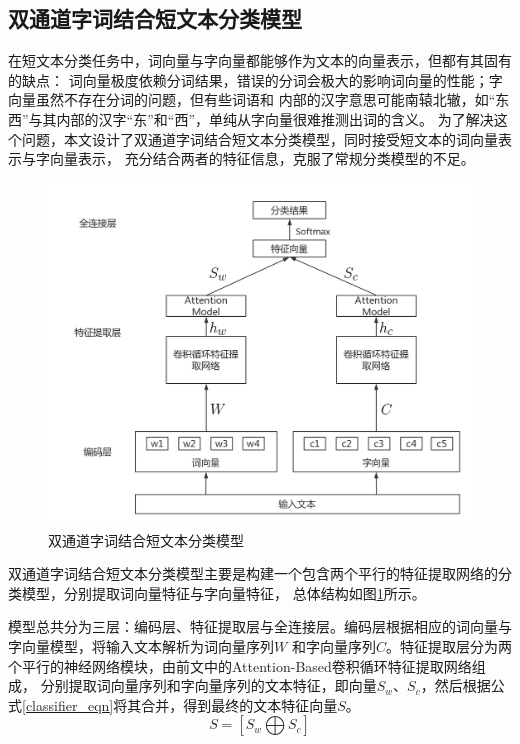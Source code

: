 \subsection{双通道字词结合短文本分类模型}
在短文本分类任务中，词向量与字向量都能够作为文本的向量表示，但都有其固有的缺点：
词向量极度依赖分词结果，错误的分词会极大的影响词向量的性能；字向量虽然不存在分词的问题，但有些词语和
内部的汉字意思可能南辕北辙，如“东西”与其内部的汉字“东”和“西”，单纯从字向量很难推测出词的含义。
为了解决这个问题，本文设计了双通道字词结合短文本分类模型，同时接受短文本的词向量表示与字向量表示，
充分结合两者的特征信息，克服了常规分类模型的不足。

\begin{figure}[h]
    \includegraphics[scale=0.4]{picture/classifier.png}
    \caption{双通道字词结合短文本分类模型}
    \label{classifier}
\end{figure}

双通道字词结合短文本分类模型主要是构建一个包含两个平行的特征提取网络的分类模型，分别提取词向量特征与字向量特征，
总体结构如图\ref{classifier}所示。

模型总共分为三层：编码层、特征提取层与全连接层。编码层根据相应的词向量与字向量模型，将输入文本解析为词向量序列$W$
和字向量序列$C$。特征提取层分为两个平行的神经网络模块，由前文中的Attention-Based卷积循环特征提取网络组成，
分别提取词向量序列和字向量序列的文本特征，即向量$S_w$、$S_c$，然后根据公式\ref{classifier_eqn}将其合并，得到最终的文本特征向量$S$。
\begin{equation}
    S =\left [ S_w\bigoplus S_c \right ]
    \label{classifier_eqn}
\end{equation}


